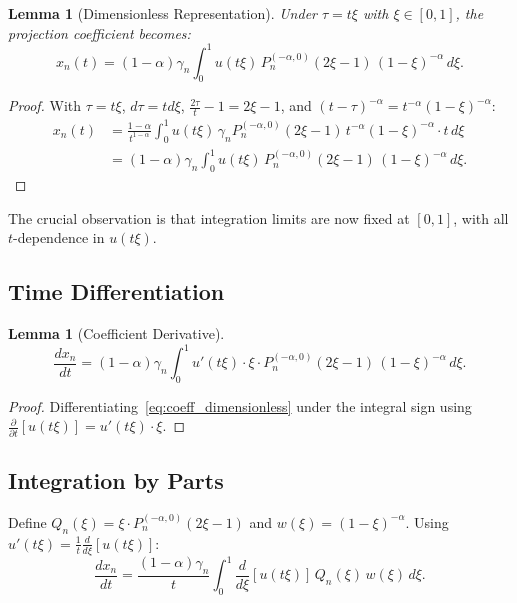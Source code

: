 \documentclass{article}
\theoremstyle{plain}
\newtheorem{lemma}[theorem]{Lemma}
\theoremstyle{definition}
\theoremstyle{remark}
\begin{document}
\begin{lemma}[Dimensionless Representation]
	\label{lem:dimensionless}
	Under $\tau = t\xi$ with $\xi \in [0, 1]$, the projection coefficient becomes:
	\begin{equation}
		x_n(t) = (1-\alpha) \gamma_n \int_0^1 u(t\xi) \, P_n^{(-\alpha, 0)}(2\xi - 1) \, (1-\xi)^{-\alpha} \, d\xi.
		\label{eq:coeff_dimensionless}
	\end{equation}
\end{lemma}

\begin{proof}
	With $\tau = t\xi$, $d\tau = t d\xi$, $\frac{2\tau}{t} - 1 = 2\xi - 1$, and $(t-\tau)^{-\alpha} = t^{-\alpha}(1-\xi)^{-\alpha}$:
	\begin{align}
		x_n(t) &= \frac{1-\alpha}{t^{1-\alpha}} \int_0^1 u(t\xi) \, \gamma_n P_n^{(-\alpha, 0)}(2\xi - 1) \, t^{-\alpha}(1-\xi)^{-\alpha} \cdot t \, d\xi \\
		&= (1-\alpha) \gamma_n \int_0^1 u(t\xi) \, P_n^{(-\alpha, 0)}(2\xi - 1) \, (1-\xi)^{-\alpha} \, d\xi.
	\end{align}
\end{proof}

The crucial observation is that integration limits are now fixed at $[0, 1]$, with all $t$-dependence in $u(t\xi)$.

\subsection{Time Differentiation}

\begin{lemma}[Coefficient Derivative]
	\label{lem:coeff_derivative}
	\begin{equation}
		\frac{dx_n}{dt} = (1-\alpha) \gamma_n \int_0^1 u'(t\xi) \cdot \xi \cdot P_n^{(-\alpha, 0)}(2\xi - 1) \, (1-\xi)^{-\alpha} \, d\xi.
	\end{equation}
\end{lemma}

\begin{proof}
	Differentiating~\eqref{eq:coeff_dimensionless} under the integral sign using $\frac{\partial}{\partial t}[u(t\xi)] = u'(t\xi) \cdot \xi$.
\end{proof}

\subsection{Integration by Parts}

Define $Q_n(\xi) = \xi \cdot P_n^{(-\alpha, 0)}(2\xi - 1)$ and $w(\xi) = (1-\xi)^{-\alpha}$. Using $u'(t\xi) = \frac{1}{t} \frac{d}{d\xi}[u(t\xi)]$:
\begin{equation}
	\frac{dx_n}{dt} = \frac{(1-\alpha)\gamma_n}{t} \int_0^1 \frac{d}{d\xi}[u(t\xi)] \, Q_n(\xi) \, w(\xi) \, d\xi.
\end{equation}
\end{document}
